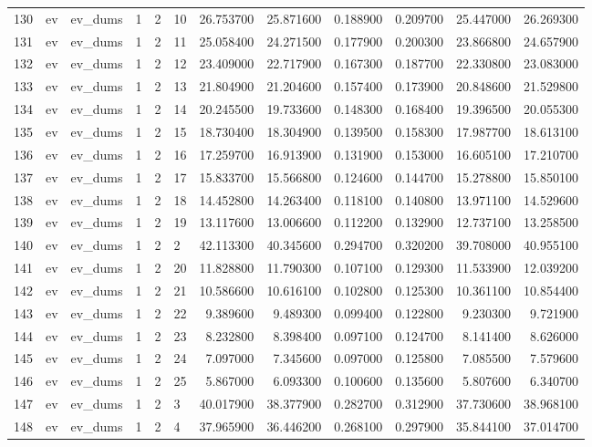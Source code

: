 \begin{tabular}{llllllrrrrrr}
130 & ev & ev_dums & 1 & 2 & 10 & 26.753700 & 25.871600 & 0.188900 & 0.209700 & 25.447000 & 26.269300 \\
131 & ev & ev_dums & 1 & 2 & 11 & 25.058400 & 24.271500 & 0.177900 & 0.200300 & 23.866800 & 24.657900 \\
132 & ev & ev_dums & 1 & 2 & 12 & 23.409000 & 22.717900 & 0.167300 & 0.187700 & 22.330800 & 23.083000 \\
133 & ev & ev_dums & 1 & 2 & 13 & 21.804900 & 21.204600 & 0.157400 & 0.173900 & 20.848600 & 21.529800 \\
134 & ev & ev_dums & 1 & 2 & 14 & 20.245500 & 19.733600 & 0.148300 & 0.168400 & 19.396500 & 20.055300 \\
135 & ev & ev_dums & 1 & 2 & 15 & 18.730400 & 18.304900 & 0.139500 & 0.158300 & 17.987700 & 18.613100 \\
136 & ev & ev_dums & 1 & 2 & 16 & 17.259700 & 16.913900 & 0.131900 & 0.153000 & 16.605100 & 17.210700 \\
137 & ev & ev_dums & 1 & 2 & 17 & 15.833700 & 15.566800 & 0.124600 & 0.144700 & 15.278800 & 15.850100 \\
138 & ev & ev_dums & 1 & 2 & 18 & 14.452800 & 14.263400 & 0.118100 & 0.140800 & 13.971100 & 14.529600 \\
139 & ev & ev_dums & 1 & 2 & 19 & 13.117600 & 13.006600 & 0.112200 & 0.132900 & 12.737100 & 13.258500 \\
140 & ev & ev_dums & 1 & 2 & 2 & 42.113300 & 40.345600 & 0.294700 & 0.320200 & 39.708000 & 40.955100 \\
141 & ev & ev_dums & 1 & 2 & 20 & 11.828800 & 11.790300 & 0.107100 & 0.129300 & 11.533900 & 12.039200 \\
142 & ev & ev_dums & 1 & 2 & 21 & 10.586600 & 10.616100 & 0.102800 & 0.125300 & 10.361100 & 10.854400 \\
143 & ev & ev_dums & 1 & 2 & 22 & 9.389600 & 9.489300 & 0.099400 & 0.122800 & 9.230300 & 9.721900 \\
144 & ev & ev_dums & 1 & 2 & 23 & 8.232800 & 8.398400 & 0.097100 & 0.124700 & 8.141400 & 8.626000 \\
145 & ev & ev_dums & 1 & 2 & 24 & 7.097000 & 7.345600 & 0.097000 & 0.125800 & 7.085500 & 7.579600 \\
146 & ev & ev_dums & 1 & 2 & 25 & 5.867000 & 6.093300 & 0.100600 & 0.135600 & 5.807600 & 6.340700 \\
147 & ev & ev_dums & 1 & 2 & 3 & 40.017900 & 38.377900 & 0.282700 & 0.312900 & 37.730600 & 38.968100 \\
148 & ev & ev_dums & 1 & 2 & 4 & 37.965900 & 36.446200 & 0.268100 & 0.297900 & 35.844100 & 37.014700 \\

\end{tabular}
